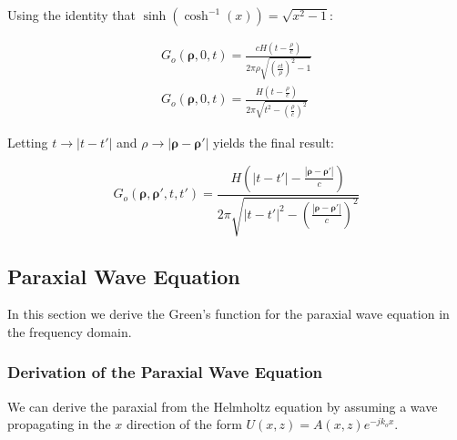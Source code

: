\noindent Using the identity that $\sinh\left(\cosh^{-1}(x) \right) = \sqrt{x^2 -1}$:

 \begin{equation}
 \begin{gathered}
G_o\left(\boldsymbol{\rho},0,t\right) = \frac{cH\left(t -\frac{\rho}{c}\right)}{2\pi \rho\sqrt{\left(\frac{ct}{\rho} \right)^2 - 1}     }\\
G_o\left(\boldsymbol{\rho},0,t\right) = \frac{H\left(t -\frac{\rho}{c}\right)}{2\pi \sqrt{t^2 - \left(\frac{\rho}{c}\right)^2}     }
\end{gathered}
\label{gf_eq:40k}
\end{equation}
 \renewcommand{\baselinestretch}{2} \small\normalsize
 
\noindent Letting $t\rightarrow |t-t'|$ and $\rho \rightarrow |\boldsymbol{\rho} - \boldsymbol{\rho}'|$ yields the final result:

 \begin{equation}
\boxed{G_o\left(\boldsymbol{\rho},\boldsymbol{\rho}',t,t'\right) = \frac{H\left(|t-t'| -\frac{|\boldsymbol{\rho} - \boldsymbol{\rho}'|}{c}\right)}{2\pi \sqrt{|t-t'|^2 -\left(\frac{|\boldsymbol{\rho} - \boldsymbol{\rho}'|}{c}\right)^2 }     }}
\label{gf_eq:40l}
\end{equation}
\renewcommand{\baselinestretch}{2} \small\normalsize

\subsection {Paraxial Wave Equation} \label{gf_sec:paraxial}
In this section we derive the Green's function for the paraxial wave equation in the frequency domain.

\subsubsection {Derivation of the Paraxial Wave Equation}
We can derive the paraxial from the Helmholtz equation by assuming a wave propagating in the $x$ direction of the form $U(x,z) = A(x,z)e^{-jk_ox}$.

